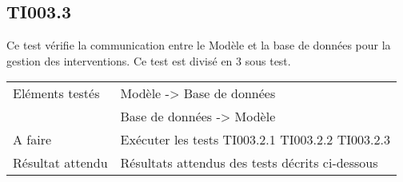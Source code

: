 \subsection{TI003.3}
  		Ce test vérifie la communication entre le Modèle et la base de données pour la gestion des interventions. Ce test est divisé en 3 sous test.
  	
 
 	 \begin{center}
    	 	\begin{tabular}[h]{|p{}|p{}|}
		\hline
			Eléments testés & Modèle -> Base de données  \\
						    &  Base de données -> Modèle \\\hline
    			A faire & Exécuter les tests TI003.2.1 TI003.2.2 TI003.2.3 \\\hline
    			Résultat attendu & Résultats attendus des tests décrits ci-dessous \\\hline
     	\end{tabular}
  	\end{center}	
  	

  		




  		
  		

